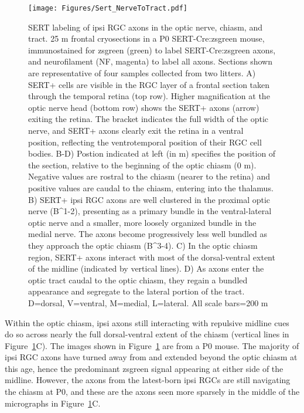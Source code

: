 \begin{figure}[hbtp]
	\begin{center}
		\texttt{[image: Figures/Sert\_NerveToTract.pdf]}
		\caption[SERT labeling of ipsi RGC axons in the optic nerve, chiasm, and tract.]
		{SERT labeling of ipsi RGC axons in the optic nerve, chiasm, and tract. 
		25 \mu m frontal cryosections in a P0 SERT-Cre:zsgreen mouse, immunostained for zsgreen (green) to label SERT-Cre:zsgreen axons, and neurofilament (NF, magenta) to label all axons.
		Sections shown are representative of four samples collected from two litters. %
		A) SERT+ cells are visible in the RGC layer of a frontal section taken through the temporal retina (top row).
		Higher magnification at the optic nerve head (bottom row) shows the SERT+ axons (arrow) exiting the retina.
		The bracket indicates the full width of the optic nerve, and SERT+ axons clearly exit the retina in a ventral position, reflecting the ventrotemporal position of their RGC cell bodies.
		B-D) Postion indicated at left (in \mu m) specifies the position of the section, relative to the beginning of the optic chiasm (0 \mu m).
		Negative values are rostral to the chiasm (nearer to the retina) and positive values are caudal to the chiasm, entering into the thalamus.
		B) SERT+ ipsi RGC axons are well clustered in the proximal optic nerve (B^{1-2}), presenting as a primary bundle in the ventral-lateral optic nerve and a smaller, more loosely organized bundle in the medial nerve. 
		The axons become progressively less well bundled as they approach the optic chiasm (B^{3-4}). 
		C) In the optic chiasm region, SERT+ axons interact with most of the dorsal-ventral extent of the midline (indicated by vertical lines).
		D) As axons enter the optic tract caudal to the optic chiasm, they regain a bundled appearance and segregate to the lateral portion of the tract.
		D=dorsal, V=ventral, M=medial, L=lateral. 
		All scale bars=200 \mu m}
		\label{Figures/Sert_NerveToTract}
	\end{center}
\end{figure}

Within the optic chiasm, ipsi axons still interacting with repulsive midline cues do so across nearly the full dorsal-ventral extent of the chiasm (vertical lines in Figure~\ref{Figures/Sert_NerveToTract}C).
The images shown in Figure~\ref{Figures/Sert_NerveToTract} are from a P0 mouse.
The majority of ipsi RGC axons have turned away from and extended beyond the optic chiasm at this age, hence the predominant zsgreen signal appearing at either side of the midline.
However, the axons from the latest-born ipsi RGCs are still navigating the chiasm at P0, and these are the axons seen more sparsely in the middle of the micrographs in Figure~\ref{Figures/Sert_NerveToTract}C.

